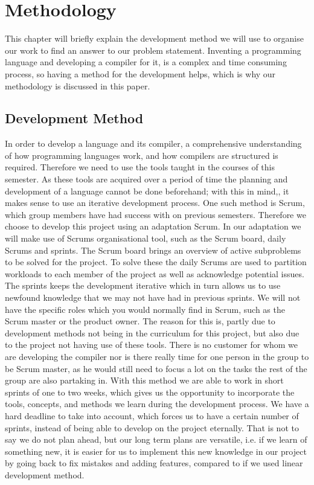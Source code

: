\chapter{Methodology}\label{chap:methdology}

This chapter will briefly explain the development method we will use to organise our work to find an answer to our problem statement. 
Inventing a programming language and developing a compiler for it, is a complex and time consuming process, so having a method for the development helps, which is why our methodology is discussed in this paper.

\section{Development Method} 
In order to develop a language and its compiler, a comprehensive understanding of how programming languages work, and how compilers are structured is required.
Therefore we need to use the tools taught in the courses of this semester.
As these tools are acquired over a period of time the planning and development of a language cannot be done beforehand; with this in mind,, it makes sense to use an iterative development process.
One such method is Scrum, which group members have had success with on previous semesters.
Therefore we choose to develop this project using an adaptation Scrum.
In our adaptation we will make use of Scrums organisational tool, such as the Scrum board, daily Scrums and sprints.
The Scrum board brings an overview of active subproblems to be solved for the project.
To solve these the daily Scrums are used to partition workloads to each member of the project as well as acknowledge potential issues.
The sprints keeps the development iterative which in turn allows us to use newfound knowledge that we may not have had in previous sprints.
We will not have the specific roles which you would normally find in Scrum, such as the Scrum master or the product owner. \citep{Scrum}
The reason for this is, partly due to development methods not being in the curriculum for this project, but also due to the project not having use of these tools.
There is no customer for whom we are developing the compiler nor is there really time for one person in the group to be Scrum master, as he would still need to focus a lot on the tasks the rest of the group are also partaking in.
With this method we are able to work in short sprints of one to two weeks, which gives us the opportunity to incorporate the tools, concepts, and methods we learn during the development process.
We have a hard deadline to take into account, which forces us to have a certain number of sprints, instead of being able to develop on the project eternally.
That is not to say we do not plan ahead, but our long term plans are versatile, i.e. if we learn of something new, it is easier for us to implement this new knowledge in our project by going back to fix mistakes and adding features, compared to if we used linear development method.

